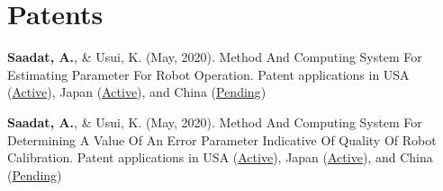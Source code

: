 \documentclass[letterpaper,11pt]{article}
\newcommand{\shiftleft}[2]{\makebox[0pt][r]{\makebox[#1][l]{#2}}}
\newcommand{\cvIcon}[1]{\BeginAccSupp{ActualText={}}#1\EndAccSupp{}}
\def\shiftleft#1#2{}%
\def\faScroll{}%
\begin{document}
\section[Patents]{\shiftleft{20pt}{\cvIcon{\faScroll}}Patents}
 \begin{itemize}[leftmargin=0.15in, label={}]
    \small{\item{\textbf{Saadat, A.}, \& Usui, K. (May, 2020). Method And Computing System For Estimating Parameter For Robot Operation. Patent applications in USA (\href{https://patents.google.com/patent/US20210347049A1/en}{Active}), Japan (\href{https://patents.google.com/patent/JP7098124B2/en}{Active}), and China (\href{https://patents.google.com/patent/CN113924192A/en}{Pending})}
    \item{\textbf{Saadat, A.}, \& Usui, K. (May, 2020). Method And Computing System For Determining A Value Of An Error Parameter Indicative Of Quality Of Robot Calibration. Patent applications in USA (\href{https://patents.google.com/patent/US20210347054A1/en}{Active}), Japan (\href{https://patents.google.com/patent/JP7076756B2/en}{Active}), and China (\href{https://patents.google.com/patent/CN113939783A/en}{Pending})}
    }
 \end{itemize}
\vspace{-10pt}


\end{document}
